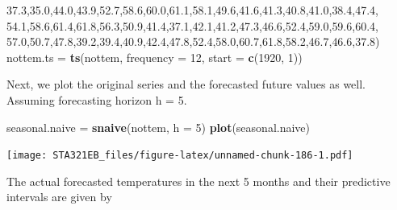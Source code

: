 \documentclass[
]{book}
\newenvironment{Shaded}{\begin{snugshade}}{\end{snugshade}}
\newcommand{\AttributeTok}[1]{\textcolor[rgb]{0.13,0.29,0.53}{#1}}
\newcommand{\DecValTok}[1]{\textcolor[rgb]{0.00,0.00,0.81}{#1}}
\newcommand{\FloatTok}[1]{\textcolor[rgb]{0.00,0.00,0.81}{#1}}
\newcommand{\FunctionTok}[1]{\textcolor[rgb]{0.13,0.29,0.53}{\textbf{#1}}}
\newcommand{\NormalTok}[1]{#1}
\newcommand{\OtherTok}[1]{\textcolor[rgb]{0.56,0.35,0.01}{#1}}
\begin{document}
\begin{Shaded}
\begin{Highlighting}[]
          \FloatTok{37.3}\NormalTok{,}\FloatTok{35.0}\NormalTok{,}\FloatTok{44.0}\NormalTok{,}\FloatTok{43.9}\NormalTok{,}\FloatTok{52.7}\NormalTok{,}\FloatTok{58.6}\NormalTok{,}\FloatTok{60.0}\NormalTok{,}\FloatTok{61.1}\NormalTok{,}\FloatTok{58.1}\NormalTok{,}\FloatTok{49.6}\NormalTok{,}\FloatTok{41.6}\NormalTok{,}\FloatTok{41.3}\NormalTok{,}\FloatTok{40.8}\NormalTok{,}\FloatTok{41.0}\NormalTok{,}\FloatTok{38.4}\NormalTok{,}\FloatTok{47.4}\NormalTok{,}
          \FloatTok{54.1}\NormalTok{,}\FloatTok{58.6}\NormalTok{,}\FloatTok{61.4}\NormalTok{,}\FloatTok{61.8}\NormalTok{,}\FloatTok{56.3}\NormalTok{,}\FloatTok{50.9}\NormalTok{,}\FloatTok{41.4}\NormalTok{,}\FloatTok{37.1}\NormalTok{,}\FloatTok{42.1}\NormalTok{,}\FloatTok{41.2}\NormalTok{,}\FloatTok{47.3}\NormalTok{,}\FloatTok{46.6}\NormalTok{,}\FloatTok{52.4}\NormalTok{,}\FloatTok{59.0}\NormalTok{,}\FloatTok{59.6}\NormalTok{,}\FloatTok{60.4}\NormalTok{,}
          \FloatTok{57.0}\NormalTok{,}\FloatTok{50.7}\NormalTok{,}\FloatTok{47.8}\NormalTok{,}\FloatTok{39.2}\NormalTok{,}\FloatTok{39.4}\NormalTok{,}\FloatTok{40.9}\NormalTok{,}\FloatTok{42.4}\NormalTok{,}\FloatTok{47.8}\NormalTok{,}\FloatTok{52.4}\NormalTok{,}\FloatTok{58.0}\NormalTok{,}\FloatTok{60.7}\NormalTok{,}\FloatTok{61.8}\NormalTok{,}\FloatTok{58.2}\NormalTok{,}\FloatTok{46.7}\NormalTok{,}\FloatTok{46.6}\NormalTok{,}\FloatTok{37.8}\NormalTok{)}
\NormalTok{nottem.ts }\OtherTok{=} \FunctionTok{ts}\NormalTok{(nottem, }\AttributeTok{frequency =} \DecValTok{12}\NormalTok{, }\AttributeTok{start =} \FunctionTok{c}\NormalTok{(}\DecValTok{1920}\NormalTok{, }\DecValTok{1}\NormalTok{))}
\end{Highlighting}
\end{Shaded}

Next, we plot the original series and the forecasted future values as well. Assuming forecasting horizon h = 5.

\begin{Shaded}
\begin{Highlighting}[]
\NormalTok{seasonal.naive }\OtherTok{=} \FunctionTok{snaive}\NormalTok{(nottem, }\AttributeTok{h =} \DecValTok{5}\NormalTok{)}
\FunctionTok{plot}\NormalTok{(seasonal.naive)}
\end{Highlighting}
\end{Shaded}

\texttt{[image: STA321EB\_files/figure-latex/unnamed-chunk-186-1.pdf]}

The actual forecasted temperatures in the next 5 months and their predictive intervals are given by
\end{document}
